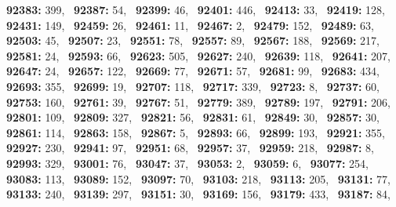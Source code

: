 \textbf{92383:} 399,\allowbreak~ 
\textbf{92387:} 54,\allowbreak~ 
\textbf{92399:} 46,\allowbreak~ 
\textbf{92401:} 446,\allowbreak~ 
\textbf{92413:} 33,\allowbreak~ 
\textbf{92419:} 128,\allowbreak~ 
\textbf{92431:} 149,\allowbreak~ 
\textbf{92459:} 26,\allowbreak~ 
\textbf{92461:} 11,\allowbreak~ 
\textbf{92467:} 2,\allowbreak~ 
\textbf{92479:} 152,\allowbreak~ 
\textbf{92489:} 63,\allowbreak~ 
\textbf{92503:} 45,\allowbreak~ 
\textbf{92507:} 23,\allowbreak~ 
\textbf{92551:} 78,\allowbreak~ 
\textbf{92557:} 89,\allowbreak~ 
\textbf{92567:} 188,\allowbreak~ 
\textbf{92569:} 217,\allowbreak~ 
\textbf{92581:} 24,\allowbreak~ 
\textbf{92593:} 66,\allowbreak~ 
\textbf{92623:} 505,\allowbreak~ 
\textbf{92627:} 240,\allowbreak~ 
\textbf{92639:} 118,\allowbreak~ 
\textbf{92641:} 207,\allowbreak~ 
\textbf{92647:} 24,\allowbreak~ 
\textbf{92657:} 122,\allowbreak~ 
\textbf{92669:} 77,\allowbreak~ 
\textbf{92671:} 57,\allowbreak~ 
\textbf{92681:} 99,\allowbreak~ 
\textbf{92683:} 434,\allowbreak~ 
\textbf{92693:} 355,\allowbreak~ 
\textbf{92699:} 19,\allowbreak~ 
\textbf{92707:} 118,\allowbreak~ 
\textbf{92717:} 339,\allowbreak~ 
\textbf{92723:} 8,\allowbreak~ 
\textbf{92737:} 60,\allowbreak~ 
\textbf{92753:} 160,\allowbreak~ 
\textbf{92761:} 39,\allowbreak~ 
\textbf{92767:} 51,\allowbreak~ 
\textbf{92779:} 389,\allowbreak~ 
\textbf{92789:} 197,\allowbreak~ 
\textbf{92791:} 206,\allowbreak~ 
\textbf{92801:} 109,\allowbreak~ 
\textbf{92809:} 327,\allowbreak~ 
\textbf{92821:} 56,\allowbreak~ 
\textbf{92831:} 61,\allowbreak~ 
\textbf{92849:} 30,\allowbreak~ 
\textbf{92857:} 30,\allowbreak~ 
\textbf{92861:} 114,\allowbreak~ 
\textbf{92863:} 158,\allowbreak~ 
\textbf{92867:} 5,\allowbreak~ 
\textbf{92893:} 66,\allowbreak~ 
\textbf{92899:} 193,\allowbreak~ 
\textbf{92921:} 355,\allowbreak~ 
\textbf{92927:} 230,\allowbreak~ 
\textbf{92941:} 97,\allowbreak~ 
\textbf{92951:} 68,\allowbreak~ 
\textbf{92957:} 37,\allowbreak~ 
\textbf{92959:} 218,\allowbreak~ 
\textbf{92987:} 8,\allowbreak~ 
\textbf{92993:} 329,\allowbreak~ 
\textbf{93001:} 76,\allowbreak~ 
\textbf{93047:} 37,\allowbreak~ 
\textbf{93053:} 2,\allowbreak~ 
\textbf{93059:} 6,\allowbreak~ 
\textbf{93077:} 254,\allowbreak~ 
\textbf{93083:} 113,\allowbreak~ 
\textbf{93089:} 152,\allowbreak~ 
\textbf{93097:} 70,\allowbreak~ 
\textbf{93103:} 218,\allowbreak~ 
\textbf{93113:} 205,\allowbreak~ 
\textbf{93131:} 77,\allowbreak~ 
\textbf{93133:} 240,\allowbreak~ 
\textbf{93139:} 297,\allowbreak~ 
\textbf{93151:} 30,\allowbreak~ 
\textbf{93169:} 156,\allowbreak~ 
\textbf{93179:} 433,\allowbreak~ 
\textbf{93187:} 84,\allowbreak~ 
